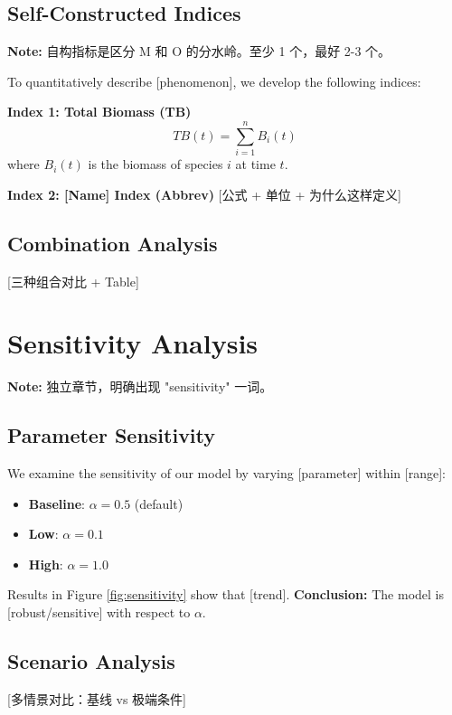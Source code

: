 \documentclass[12pt]{article}
\begin{document}
\subsection{Self-Constructed Indices}
\textbf{Note:} 自构指标是区分 M 和 O 的分水岭。至少 1 个，最好 2-3 个。

To quantitatively describe [phenomenon], we develop the following indices:

\textbf{Index 1: Total Biomass (TB)}
\begin{equation}\label{eq:tb}
    TB(t) = \sum_{i=1}^{n} B_i(t)
\end{equation}
where $B_i(t)$ is the biomass of species $i$ at time $t$.

\textbf{Index 2: [Name] Index (Abbrev)}
[公式 + 单位 + 为什么这样定义]

\subsection{Combination Analysis}
[三种组合对比 + Table]

\section{Sensitivity Analysis}

\textbf{Note:} 独立章节，明确出现 "sensitivity" 一词。

\subsection{Parameter Sensitivity}
We examine the sensitivity of our model by varying [parameter] within [range]:

\begin{itemize}[leftmargin=*]
    \item \textbf{Baseline}: $\alpha = 0.5$ (default)
    \item \textbf{Low}: $\alpha = 0.1$
    \item \textbf{High}: $\alpha = 1.0$
\end{itemize}

Results in Figure \ref{fig:sensitivity} show that [trend].
\textbf{Conclusion:} The model is [robust/sensitive] with respect to $\alpha$.

\subsection{Scenario Analysis}
[多情景对比：基线 vs 极端条件]
\end{document}
